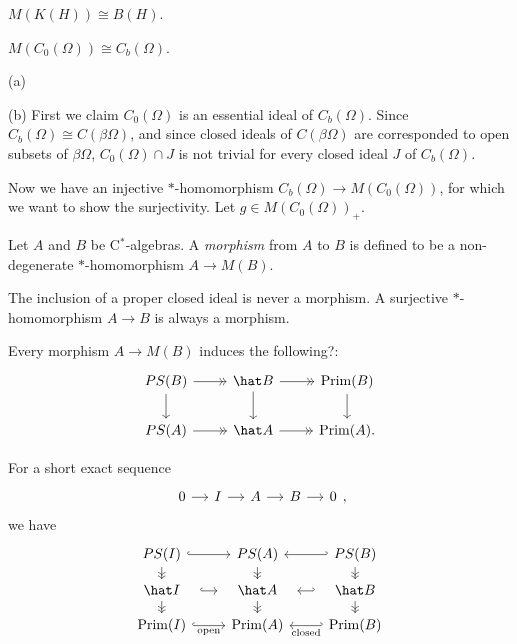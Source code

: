 \documentclass{../../large}
\newcommand{\Prim}{\operatorname{Prim}}
\begin{document}
\begin{prb}
\begin{parts}
\item $M(K(H))\cong B(H)$.
\item $M(C_0(\Omega))\cong C_b(\Omega)$.
\end{parts}
\end{prb}
\begin{pf}
(a)

(b)
First we claim $C_0(\Omega)$ is an essential ideal of $C_b(\Omega)$.
Since $C_b(\Omega)\cong C(\beta\Omega)$, and since closed ideals of $C(\beta\Omega)$ are corresponded to open subsets of $\beta\Omega$, $C_0(\Omega)\cap J$ is not trivial for every closed ideal $J$ of $C_b(\Omega)$.

Now we have an injective $*$-homomorphism $C_b(\Omega)\to M(C_0(\Omega))$, for which we want to show the surjectivity.
Let $g\in M(C_0(\Omega))_+$.
\end{pf}


\begin{prb}[Morphisms]
Let $A$ and $B$ be C$^*$-algebras.
A \emph{morphism} from $A$ to $B$ is defined to be a non-degenerate $*$-homomorphism $A\to M(B)$.
\begin{parts}
\item The inclusion of a proper closed ideal is never a morphism. A surjective $*$-homomorphism $A\to B$ is always a morphism.
\end{parts}
\end{prb}


Every morphism $A\to M(B)$ induces the following?:
\[\begin{tikzcd}
PS(B) \rar[->>]\dar & \hat B \rar[->>]\dar & \Prim(B) \dar \\
PS(A) \rar[->>] & \hat A \rar[->>] & \Prim(A).
\end{tikzcd}\]

For a short exact sequence
\[\begin{tikzcd}[column sep=small]0\rar&I\rar&A\rar&B\rar&0\end{tikzcd},\]
we have
\[\begin{tikzcd}[row sep=small]
PS(I) \dar[->>]\rar[hook] & PS(A) \dar[->>] & PS(B) \dar[->>]\lar[hook'] \\
\hat I \dar[->>]\rar[hook,shorten >= 10, shorten <= 10] & \hat A \dar[->>] & \hat B \dar[->>]\lar[hook',shorten >= 10, shorten <= 10] \\
\Prim(I) \rar[hook,swap]{\text{open}} & \Prim(A) & \Prim(B) \lar[hook']{\text{closed}}
\end{tikzcd}\]
\end{document}
